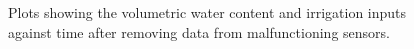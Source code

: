 \documentclass[12pt]{scrartcl}
\begin{document}
\begin{figure}[!htb]
        \caption{\label{fig:VWC-clean-data} Plots showing the volumetric water content and irrigation inputs against time after removing data from malfunctioning sensors.}
\end{figure}
\end{document}
